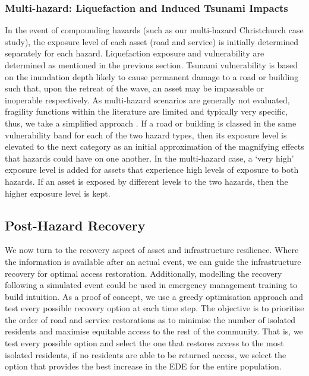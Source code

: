\documentclass[review,3p,times,onecolumn,sort&compress,12pt]{elsarticle}
\let \cite \parencite
\begin{document}
\subsubsection{Multi-hazard: Liquefaction and Induced Tsunami Impacts}
In the event of compounding hazards (such as our multi-hazard Christchurch case study), the exposure level of each asset (road and service) is initially determined separately for each hazard. 
Liquefaction exposure and vulnerability are determined as mentioned in the previous section.
Tsunami vulnerability is based on the inundation depth likely to cause permanent damage to a road or building such that, upon the retreat of the wave, an asset may be impassable or inoperable respectively. 
As multi-hazard scenarios are generally not evaluated, fragility functions within the literature are limited and typically very specific, thus, we take a simplified approach \cite{Gehl_undated-rx}. 
If a road or building is classed in the same vulnerability band for each of the two hazard types, then its exposure level is elevated to the next category as an initial approximation of the magnifying effects that hazards could have on one another. 
In the multi-hazard case, a ‘very high’ exposure level is added for assets that experience high levels of exposure to both hazards. 
If an asset is exposed by different levels to the two hazards, then the higher exposure level is kept.

\subsection{Post-Hazard Recovery}
We now turn to the recovery aspect of asset and infrastructure resilience.
Where the information is available after an actual event, we can guide the infrastructure recovery for optimal access restoration.
Additionally, modelling the recovery following a simulated event could be used in emergency management training to build intuition. 
As a proof of concept, we use a greedy optimisation approach and test every possible recovery option at each time step.
The objective is to prioritise the order of road and service restorations as to minimise the number of isolated residents and maximise equitable access to the rest of the community.
That is, we test every possible option and select the one that restores access to the most isolated residents, if no residents are able to be returned access, we select the option that provides the best increase in the EDE for the entire population.
\end{document}
